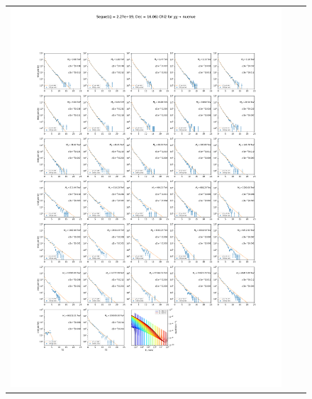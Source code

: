 \begin{figure}[!hb]
{\begin{tabular}{ccc}
            \includegraphics[clip, trim=22.1cm 6.5cm 19.5cm 56.5cm, scale=0.55]{figures/ic_DM/dm_plots/Segue1_nuenue_chi2_Masspanel_2024-03-23.pdf} &

\end{tabular}}
\end{figure}
